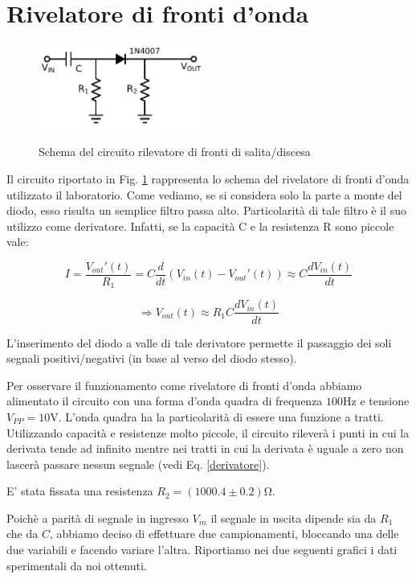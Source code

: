 \section{Rivelatore di fronti d'onda}
\begin{figure}
	\caption{Schema del circuito rilevatore di fronti di salita/discesa}
	\includegraphics[width=54mm]{schema_peak_detector.pdf}
	\label{fig:schema_peak_detector}
\end{figure}

Il circuito riportato in Fig. \ref{fig:schema_peak_detector} rappresenta lo schema del rivelatore di fronti d'onda utilizzato il laboratorio. Come vediamo, se si considera solo la parte a monte del diodo, esso risulta un semplice filtro passa alto. Particolarità di tale filtro è il suo utilizzo come derivatore. Infatti, se la capacità C e la resistenza R sono piccole vale:

$$ I=\frac{V_{out}'(t)}{R_1}=C\frac{d}{dt}(V_{in}(t)-V_{out}'(t)) \approx C \frac{dV_{in}(t)}{dt} $$

\begin{equation} 
\Rightarrow V_{out}(t) \approx R_1C \frac{dV_{in}(t)}{dt} 
\label{derivatore}
\end{equation}

L'inserimento del diodo a valle di tale derivatore permette il passaggio dei soli segnali positivi/negativi (in base al verso del diodo stesso).

Per osservare il funzionamento come rivelatore di fronti d'onda abbiamo alimentato il circuito con una forma d'onda quadra di frequenza $100 \si{\hertz}$ e tensione $V_{PP}=10 \si{\volt}$. L'onda quadra ha la particolarità di essere una funzione a tratti. Utilizzando capacità e resistenze molto piccole, il circuito rileverà i punti in cui la derivata tende ad infinito mentre nei tratti in cui la derivata è uguale a zero non lascerà passare nessun segnale (vedi Eq. \ref{derivatore}).

E' stata fissata una resistenza $R_2=(1000.4 \pm 0.2) \si{\ohm}$. 

Poichè a parità di segnale in ingresso $V_{in}$ il segnale in uscita dipende sia da $R_1$ che da $C$, abbiamo deciso di effettuare due campionamenti, bloccando una delle due variabili e facendo variare l'altra. Riportiamo nei due seguenti grafici i dati sperimentali da noi ottenuti.


